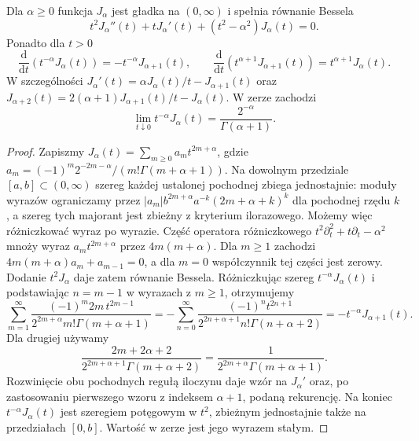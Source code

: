 \begin{stwierdzenie}
\label{prop:dt-bessel-equation}
Dla $\alpha\ge0$ funkcja $J_\alpha$ jest gładka na
$(0,\infty)$ i spełnia równanie Bessela
\[
 t^2J_\alpha''(t)+tJ_\alpha'(t)+(t^2-\alpha^2)J_\alpha(t)=0.
\]
Ponadto dla $t>0$
\[
 \frac{\mathrm d}{\mathrm dt}(t^{-\alpha}J_\alpha(t))
 =-t^{-\alpha}J_{\alpha+1}(t),\qquad
 \frac{\mathrm d}{\mathrm dt}(t^{\alpha+1}J_{\alpha+1}(t))
 =t^{\alpha+1}J_\alpha(t).
\]
W szczególności $J_\alpha'(t)=\alpha J_\alpha(t)/t-J_{\alpha+1}(t)$
oraz
$J_{\alpha+2}(t)=2(\alpha+1)J_{\alpha+1}(t)/t-J_\alpha(t)$.
W zerze zachodzi
\[
 \lim_{t\downarrow0}t^{-\alpha}J_\alpha(t)
 =\frac{2^{-\alpha}}{\Gamma(\alpha+1)}.
\]
\end{stwierdzenie}
\begin{proof}
Zapiszmy $J_\alpha(t)=\sum_{m\ge0}a_m t^{2m+\alpha}$,
gdzie $a_m=(-1)^m2^{-2m-\alpha}/(m!\Gamma(m+\alpha+1))$.
Na dowolnym przedziale $[a,b]\subset(0,\infty)$
szereg każdej ustalonej pochodnej zbiega jednostajnie:
moduły wyrazów ograniczamy przez
$|a_m|b^{2m+\alpha}a^{-k}(2m+\alpha+k)^k$
dla pochodnej rzędu $k$, a szereg tych majorant
jest zbieżny z kryterium ilorazowego.
Możemy więc różniczkować wyraz po wyrazie.
Część operatora różniczkowego
$t^2\partial_t^2+t\partial_t-\alpha^2$ mnoży wyraz
$a_mt^{2m+\alpha}$ przez $4m(m+\alpha)$.
Dla $m\ge1$ zachodzi
$4m(m+\alpha)a_m+a_{m-1}=0$,
a dla $m=0$ współczynnik tej części jest zerowy.
Dodanie $t^2J_\alpha$ daje zatem równanie Bessela.
Różniczkując szereg $t^{-\alpha}J_\alpha(t)$
i podstawiając $n=m-1$ w wyrazach z $m\ge1$,
otrzymujemy
\[
 \sum_{m=1}^\infty
 \frac{(-1)^m 2m\,t^{2m-1}}{2^{2m+\alpha}m!\Gamma(m+\alpha+1)}
 =-\sum_{n=0}^\infty
 \frac{(-1)^n t^{2n+1}}{2^{2n+\alpha+1}n!\Gamma(n+\alpha+2)}
 =-t^{-\alpha}J_{\alpha+1}(t).
\]
Dla drugiej używamy
\[
 \frac{2m+2\alpha+2}{2^{2m+\alpha+1}\Gamma(m+\alpha+2)}
 =\frac{1}{2^{2m+\alpha}\Gamma(m+\alpha+1)}.
\]
Rozwinięcie obu pochodnych regułą iloczynu daje wzór
na $J_\alpha'$ oraz, po zastosowaniu pierwszego wzoru
z indeksem $\alpha+1$, podaną rekurencję.
Na koniec $t^{-\alpha}J_\alpha(t)$ jest szeregiem
potęgowym w $t^2$, zbieżnym jednostajnie także
na przedziałach $[0,b]$. Wartość w zerze jest jego
wyrazem stałym.
\end{proof}

